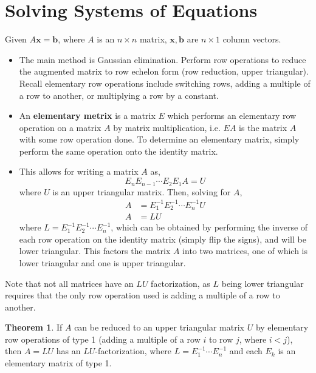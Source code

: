 \documentclass[letterpaper,12pt]{article}
\theoremstyle{definition}
\newtheorem*{theorem}{Theorem}
\renewcommand{\vec}[1]{\mathbf{#1}}
\begin{document}
\section*{Solving Systems of Equations}
Given $A\vec{x} = \vec{b}$, where $A$ is an $n \times n$ matrix, $\vec{x}, \vec{b}$ are $n \times 1$ column vectors.
\begin{itemize}
    \item The main method is Gaussian elimination. Perform row operations to reduce the augmented matrix to row echelon form (row reduction, upper triangular). Recall elementary row operations include switching rows, adding a multiple of a row to another, or multiplying a row by a constant.
    \item An \textbf{elementary metrix} is a matrix $E$ which performs an elementary row operation on a matrix $A$ by matrix multiplication, i.e. $EA$ is the matrix $A$ with some row operation done. To determine an elementary matrix, simply perform the same operation onto the identity matrix.
    \item This allows for writing a matrix $A$ as,
    \begin{equation*}
        E_n E_{n-1} \cdots E_2 E_1 A = U
    \end{equation*}
    where $U$ is an upper triangular matrix. Then, solving for $A$,
    \begin{align*}
        A & = E_1^{-1} E_2^{-1} \cdots E_n^{-1} U \\
        A & = L U
    \end{align*}
    where $L = E_1^{-1} E_2^{-1} \cdots E_n^{-1}$, which can be obtained by performing the inverse of each row operation on the identity matrix (simply flip the signs), and will be lower triangular. This factors the matrix $A$ into two matrices, one of which is lower triangular and one is upper triangular.
\end{itemize}

Note that not all matrices have an $LU$ factorization, as $L$ being lower triangular requires that the only row operation used is adding a multiple of a row to another.

\begin{theorem}
If $A$ can be reduced to an upper triangular matrix $U$ by elementary row operations of type 1 (adding a multiple of a row $i$ to row $j$, where $i < j$), then $A = LU$ has an $LU$-factorization, where $L = E_1^{-1} \cdots E_n^{-1}$ and each $E_k$ is an elementary matrix of type 1.
\end{theorem}
\end{document}
